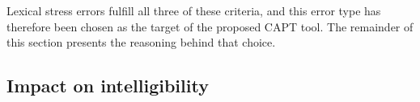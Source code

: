 	Lexical stress errors 
	fulfill all three of these criteria, and this error type has therefore been chosen as the target of the proposed CAPT tool. The remainder of this section 
	presents the reasoning behind 
	that choice. 
%	
%	
%
%	 

%
%	
%
		\subsection{Impact on intelligibility}
		\label{sec:targeting:intelligibility}
		

